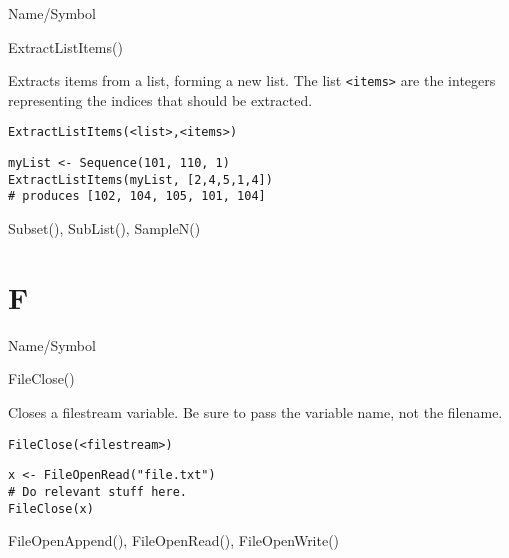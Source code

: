 \rl




\begin{desc}{Name/Symbol}
\item[Name/Symbol]	ExtractListItems()

\item[Description]	Extracts items from a list, forming a new list. 
		The list \verb+<items>+ are the integers representing the
		indices that should be extracted.  
	     
\item[Usage]
\begin{verbatim}
ExtractListItems(<list>,<items>)
\end{verbatim}

\item[Example]
\begin{verbatim}
myList <- Sequence(101, 110, 1)
ExtractListItems(myList, [2,4,5,1,4])
# produces [102, 104, 105, 101, 104]
\end{verbatim}

\item[See Also]	Subset(), SubList(), SampleN()
\end{desc}

\rl

\section{F}
\rl



\begin{desc}{Name/Symbol}
\item[Name/Symbol]	FileClose()

\item[Description]	Closes a filestream  variable.  Be sure to 
		pass the variable name, not the filename.  

\item[Usage]
\begin{verbatim}
FileClose(<filestream>)
\end{verbatim}

\item[Example]
\begin{verbatim}
x <- FileOpenRead("file.txt")
# Do relevant stuff here.
FileClose(x)
\end{verbatim}

\item[See Also]	FileOpenAppend(), FileOpenRead(), FileOpenWrite()
\end{desc}


